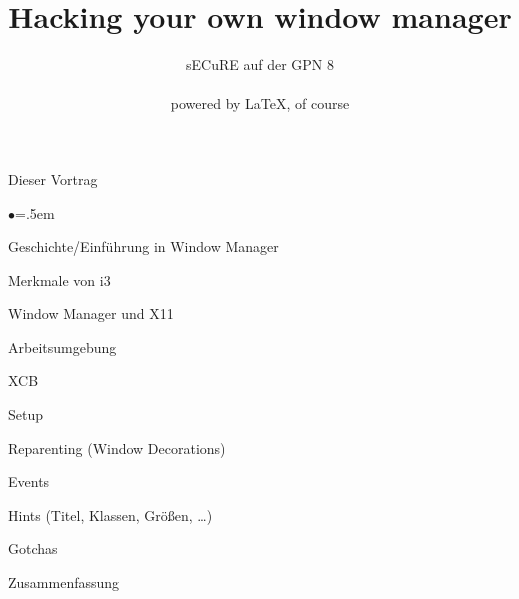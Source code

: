 \documentclass[mode=print,paper=screen,style=jefka]{powerdot}
\title{Hacking your own window manager}
\author{sECuRE auf der GPN 8\\
~\\
powered by \LaTeX, of course}
\begin{document}
\maketitle

\begin{slide}{Dieser Vortrag}
\begin{list}{$\bullet$}{\itemsep=.5em}
        \item Geschichte/Einführung in Window Manager
        \item Merkmale von i3
        \item Window Manager und X11
        \item Arbeitsumgebung
        \item XCB
        \item Setup
        \item Reparenting (Window Decorations)

        \item Events
        \item Hints (Titel, Klassen, Größen, …)
        \item Gotchas
        \item Zusammenfassung
\end{list}
\end{slide}
\end{document}
